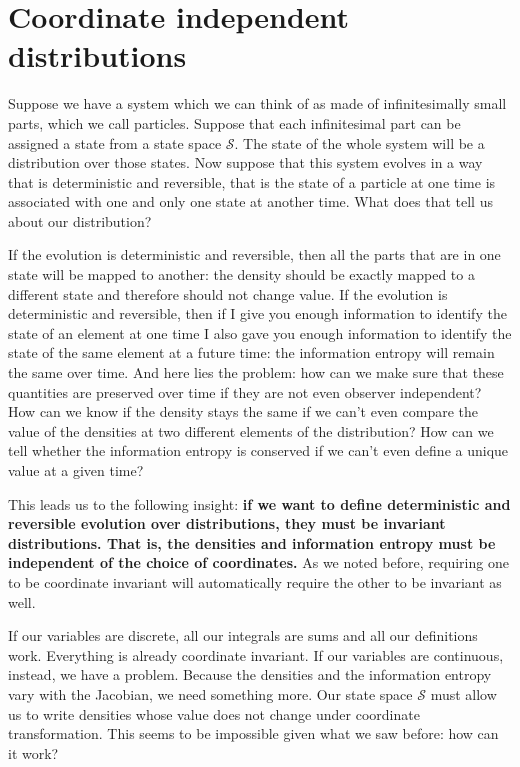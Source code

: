 \documentclass[11pt]{article}
\begin{document}
\section{Coordinate independent distributions}

Suppose we have a system which we can think of as made of infinitesimally small parts, which we call particles. Suppose  that each infinitesimal part can be assigned a state from a state space $\mathcal{S}$. The state of the whole system will be a distribution over those states. Now suppose that this system evolves in a way that is deterministic and reversible, that is the state of a particle at one time is associated with one and only one state at another time. What does that tell us about our distribution?

If the evolution is deterministic and reversible, then all the parts that are in one state will be mapped to another: the density should be exactly mapped to a different state and therefore should not change value. If the evolution is deterministic and reversible, then if I give you enough information to identify the state of an element at one time I also gave you enough information to identify the state of the same element at a future time: the information entropy will remain the same over time. And here lies the problem: how can we make sure that these quantities are preserved over time if they are not even observer independent? How can we know if the density stays the same if we can't even compare the value of the densities at two different elements of the distribution? How can we tell whether the information entropy is conserved if we can't even define a unique value at a given time?

This leads us to the following insight: \textbf{if we want to define deterministic and reversible evolution over distributions, they must be invariant distributions. That is, the densities and information entropy must be independent of the choice of coordinates.} As we noted before, requiring one to be coordinate invariant will automatically require the other to be invariant as well.

If our variables are discrete, all our integrals are sums and all our definitions work. Everything is already coordinate invariant. If our variables are continuous, instead, we have a problem. Because the densities and the information entropy vary with the Jacobian, we need something more. Our state space $\mathcal{S}$ must allow us to write densities whose value does not change under coordinate transformation. This seems to be impossible given what we saw before: how can it work?
\end{document}
